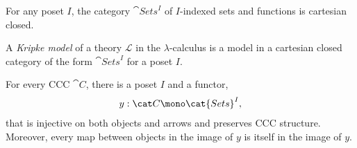 \documentclass{article}
\begin{document}
\begin{proposition}[Awodey p. 143]
    For any poset $I$, the category $\cat{Sets}^I$ of $I$-indexed sets
    and functions is cartesian closed.    
\end{proposition}

\begin{definition}[Awodey p. 144]
    A \emph{Kripke model} of a theory $\mathcal{L}$ in the $\lambda$-calculus
    is a model in a cartesian closed category of the form $\cat{Sets}^I$
    for a poset $I$.
\end{definition}

\begin{proposition}[Awodey p. 144]
    For every CCC $\cat C$, there is a poset $I$ and a functor,
    \begin{align*}
        y : \cat C \mono \cat{Sets}^I,
    \end{align*} 
    that is injective on both objects and arrows and preserves CCC structure.
    Moreover, every map between objects in the image of $y$ is itself in the
    image of $y$.
\end{proposition}
\end{document}
